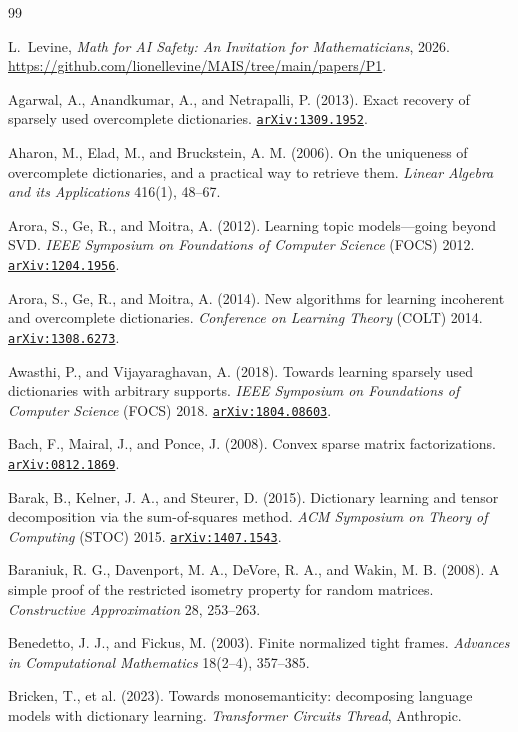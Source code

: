 \documentclass[11pt]{amsart}
\newcommand{\arxiv}[1]{\href{https://arxiv.org/abs/#1}{\texttt{arXiv:#1}}}
\theoremstyle{plain}
\theoremstyle{definition}
\begin{document}
\begin{thebibliography}{99}

L.~Levine,
\emph{Math for AI Safety: An Invitation for Mathematicians},
2026. \url{https://github.com/lionellevine/MAIS/tree/main/papers/P1}.


 Agarwal, A., Anandkumar, A., and Netrapalli, P. (2013). Exact recovery of sparsely used overcomplete dictionaries. \arxiv{1309.1952}.

 Aharon, M., Elad, M., and Bruckstein, A. M. (2006). On the uniqueness of overcomplete dictionaries, and a practical way to retrieve them. \emph{Linear Algebra and its Applications} 416(1), 48--67.

 Arora, S., Ge, R., and Moitra, A. (2012). Learning topic models---going beyond SVD. \emph{IEEE Symposium on Foundations of Computer Science} (FOCS) 2012. \arxiv{1204.1956}.

 Arora, S., Ge, R., and Moitra, A. (2014). New algorithms for learning incoherent and overcomplete dictionaries. \emph{Conference on Learning Theory} (COLT) 2014. \arxiv{1308.6273}.

 Awasthi, P., and Vijayaraghavan, A. (2018). Towards learning sparsely used dictionaries with arbitrary supports. \emph{IEEE Symposium on Foundations of Computer Science} (FOCS) 2018. \arxiv{1804.08603}.

 Bach, F., Mairal, J., and Ponce, J. (2008). Convex sparse matrix factorizations. \arxiv{0812.1869}.

 Barak, B., Kelner, J. A., and Steurer, D. (2015). Dictionary learning and tensor decomposition via the sum-of-squares method. \emph{ACM Symposium on Theory of Computing} (STOC) 2015. \arxiv{1407.1543}.

 Baraniuk, R. G., Davenport, M. A., DeVore, R. A., and Wakin, M. B. (2008). A simple proof of the restricted isometry property for random matrices. \emph{Constructive Approximation} 28, 253--263.

 Benedetto, J. J., and Fickus, M. (2003). Finite normalized tight frames. \emph{Advances in Computational Mathematics} 18(2--4), 357--385.

 Bricken, T., et al. (2023). Towards monosemanticity: decomposing language models with dictionary learning. \emph{Transformer Circuits Thread}, Anthropic.


\end{thebibliography}
\end{document}
